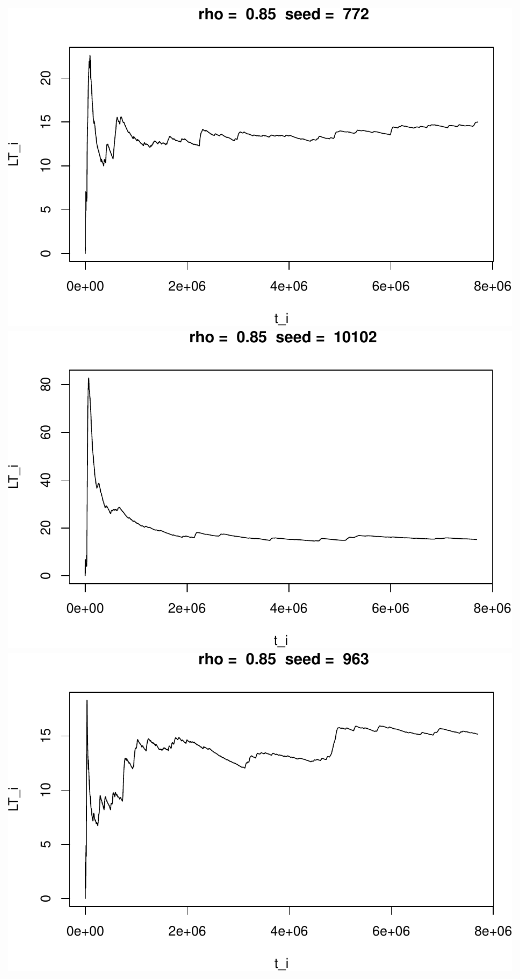 \documentclass[]{article}
\begin{document}
\includegraphics{003_files/figure-latex/unnamed-chunk-19-1.pdf}
\includegraphics{003_files/figure-latex/unnamed-chunk-19-2.pdf}
\includegraphics{003_files/figure-latex/unnamed-chunk-19-3.pdf}
\end{document}
